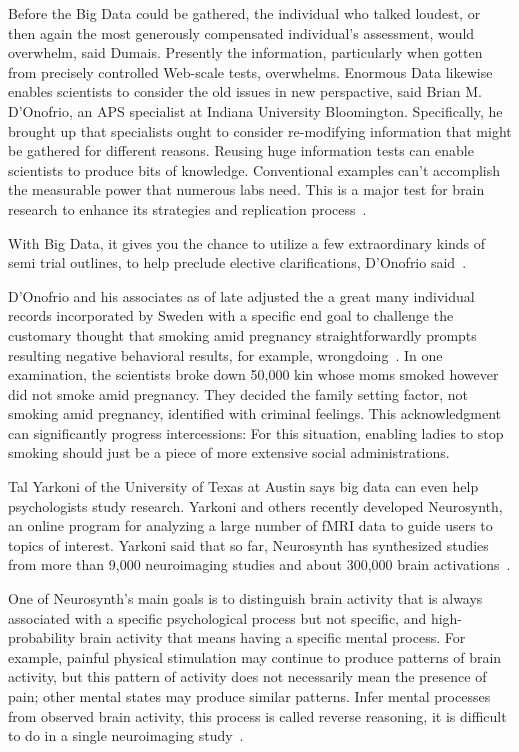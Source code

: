 Before the Big Data could be gathered, the individual who talked 
loudest, or then again the most generously compensated individual's
 assessment, would overwhelm, said Dumais. Presently the 
information, particularly when gotten from precisely controlled
 Web-scale tests, overwhelms. Enormous Data likewise
 enables scientists to consider the old issues in new perspactive, said 
Brian M. D'Onofrio, an APS specialist at Indiana University 
Bloomington. Specifically, he brought up that specialists ought to
 consider re-modifying information that might be gathered for 
different reasons. Reusing huge information tests can enable 
scientists to produce bits of knowledge. Conventional examples 
can't accomplish the measurable power that numerous labs need. 
This is a major test for brain research to enhance its strategies 
and replication process~\cite{hid515-00}.

With Big Data, it gives you the chance to utilize a few 
extraordinary 
kinds of semi trial outlines, to help preclude elective 
clarifications, D'Onofrio said~\cite{hid515-00}.

D'Onofrio and his associates as of late adjusted the a great many 
individual records incorporated by Sweden with a specific end goal 
to challenge the customary 
thought that smoking amid pregnancy straightforwardly prompts 
resulting negative 
behavioral results, for example, wrongdoing~\cite{hid515-00}. 
In one examination, the scientists broke down 
50,000 kin whose moms smoked however did not smoke amid pregnancy. 
They decided the family setting factor, not smoking amid pregnancy,
identified with criminal feelings. This acknowledgment can 
significantly progress intercessions: 
For this situation, enabling ladies to stop smoking should just be
 a piece of more extensive social administrations.

Tal Yarkoni of the University of Texas at Austin says big data can 
even help psychologists study research. Yarkoni and others recently 
developed Neurosynth, an online program for analyzing a large number 
of fMRI data to guide users to topics of interest. Yarkoni said that 
so far, Neurosynth has synthesized studies from more than 9,000 
neuroimaging studies and about 300,000 brain activations~\cite{hid515-00}.

One of Neurosynth's main goals is to distinguish brain activity that 
is always associated with a specific psychological process but not 
specific, and high-probability brain activity that means having a 
specific mental process. For example, painful physical stimulation 
may continue to produce patterns of brain activity, but this 
pattern 
of activity does not necessarily mean the presence of pain; other 
mental states may produce similar patterns. Infer mental processes 
from observed brain activity, this process is called reverse 
reasoning, it is difficult to do in a single neuroimaging 
study~\cite{hid515-00}.

